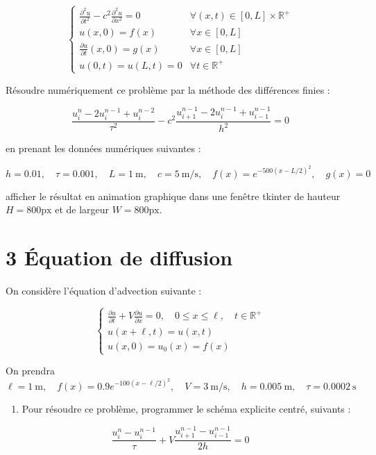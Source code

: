 \documentclass[10pt]{article}
\begin{document}
\[
\begin{cases}\frac{\partial^{2} u}{\partial t^{2}}-c^{2} \frac{\partial^{2} u}{\partial x^{2}}=0 & \forall(x, t) \in[0, L] \times \mathbb{R}^{+} \\ u(x, 0)=f(x) & \forall x \in[0, L] \\ \frac{\partial u}{\partial t}(x, 0)=g(x) & \forall x \in[0, L] \\ u(0, t)=u(L, t)=0 & \forall t \in \mathbb{R}^{+}\end{cases}
\]

Résoudre numériquement ce problème par la méthode des différences finies :

\[
\frac{u_{i}^{n}-2 u_{i}^{n-1}+u_{i}^{n-2}}{\tau^{2}}-c^{2} \frac{u_{i+1}^{n-1}-2 u_{i}^{n-1}+u_{i-1}^{n-1}}{h^{2}}=0
\]

en prenant les données numériques suivantes :

\[
h=0.01, \quad \tau=0.001, \quad L=1 \mathrm{~m}, \quad c=5 \mathrm{~m} / \mathrm{s}, \quad f(x)=e^{-500(x-L / 2)^{2}}, \quad g(x)=0
\]

afficher le résultat en animation graphique dans une fenêtre tkinter de hauteur \(H=800 \mathrm{px}\) et de largeur \(W=800 \mathrm{px}\).

\section*{3 Équation de diffusion}
On considère l'équation d'advection suivante :

\[
\left\{\begin{array}{l}
\frac{\partial u}{\partial t}+V \frac{\partial u}{\partial x}=0, \quad 0 \leq x \leq \ell, \quad t \in \mathbb{R}^{+} \\
u(x+\ell, t)=u(x, t) \\
u(x, 0)=u_{0}(x)=f(x)
\end{array}\right.
\]

On prendra \(\ell=1 \mathrm{~m}, \quad f(x)=0.9 e^{-100(x-\ell / 2)^{2}}, \quad V=3 \mathrm{~m} / \mathrm{s}, \quad h=0.005 \mathrm{~m}, \quad \tau=0.0002 \mathrm{~s}\)

\begin{enumerate}
  \item Pour résoudre ce problème, programmer le schéma explicite centré, suivants :
\end{enumerate}

\[
\frac{u_{i}^{n}-u_{i}^{n-1}}{\tau}+V \frac{u_{i+1}^{n-1}-u_{i-1}^{n-1}}{2 h}=0
\]
\end{document}
